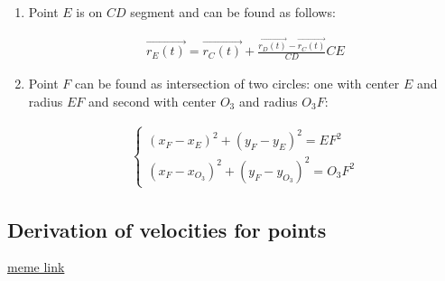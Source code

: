\begin{enumerate}
    \item Point $E$ is on $CD$ segment and can be found as follows:
          \begin{answer}
              \begin{align}
                  \vec{r_E(t)} = \vec{r_C(t)} + \frac{\vec{r_D(t)} - \vec{r_C(t)}}{CD} CE
              \end{align}
          \end{answer}

    \item Point $F$ can be found as intersection of two circles: one with center $E$ and radius $EF$ and second with center $O_3$ and radius $O_3F$:
          \begin{answer}
              \begin{align}
                  \begin{cases}
                      (x_F - x_E)^2 + (y_F - y_E)^2 = EF^2 \\
                      (x_F - x_{O_3})^2 + (y_F - y_{O_3})^2 = O_3F^2
                  \end{cases}
              \end{align}
          \end{answer}


\end{enumerate}

\subsection{Derivation of velocities for points}
\href{https://www.youtube.com/watch?v=l7jCZV_lIHM}{meme link}

